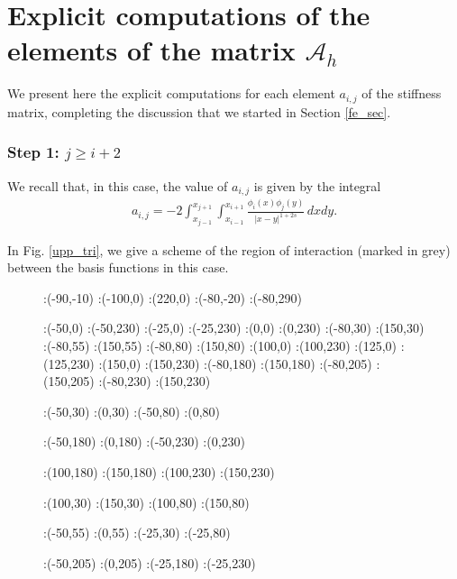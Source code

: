 {\appendix

\section{Explicit computations of the elements of the matrix $\mathcal A_h$}\label{appendix}

We present here the explicit computations for each element $a_{i,j}$ of the stiffness matrix, completing the discussion that we started in Section \ref{fe_sec}.

\subsubsection*{Step 1: $j\geq i+2$}
We recall that, in this case, the value of $a_{i,j}$ is given by the integral
\begin{align}\label{elem_noint_app}
	a_{i,j}=-2 \int_{x_{j-1}}^{x_{j+1}}\int_{x_{i-1}}^{x_{i+1}}\frac{\phi_i(x)\phi_j(y)}{|x-y|^{1+2s}}\,dxdy.
\end{align}

In Fig. \ref{upp_tri}, we give a scheme of the region of interaction (marked in grey) between the basis functions in this case. 
\begin{figure}[h]
\figinit{0.7pt}
:(-90,-10)
:(-100,0) :(220,0)
:(-80,-20) :(-80,290)

:(-50,0) :(-50,230)
:(-25,0) :(-25,230)
:(0,0) :(0,230)
%
:(-80,30) :(150,30)
:(-80,55) :(150,55)
:(-80,80) :(150,80)
%
:(100,0) :(100,230)
:(125,0) :(125,230)
:(150,0) :(150,230)
%
:(-80,180) :(150,180)
:(-80,205) :(150,205)
:(-80,230) :(150,230)

:(-50,30) :(0,30)
:(-50,80) :(0,80)

:(-50,180) :(0,180)
:(-50,230) :(0,230)

:(100,180) :(150,180)
:(100,230) :(150,230)

:(100,30) :(150,30)
:(100,80) :(150,80)

:(-50,55) :(0,55)
:(-25,30) :(-25,80)

:(-50,205) :(0,205)
:(-25,180) :(-25,230)


\end{figure}}
